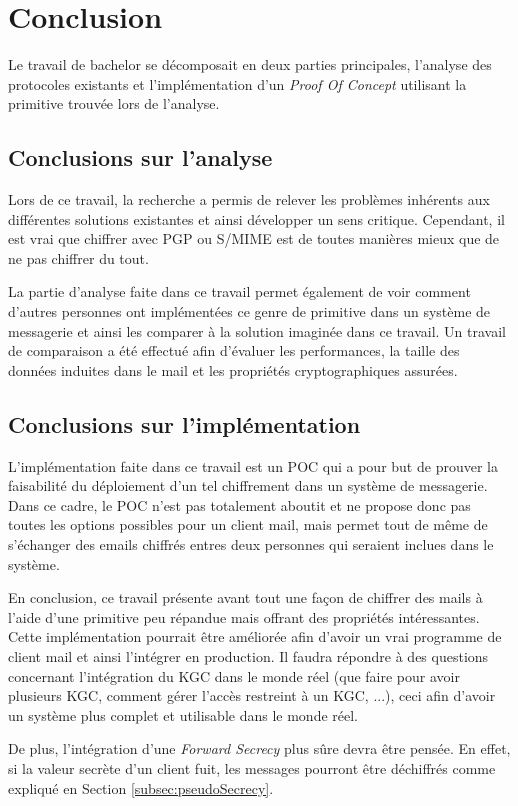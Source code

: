 \chapter{Conclusion}
\label{ch:conclusion}
Le travail de bachelor se décomposait en deux parties principales, l'analyse des protocoles existants et l'implémentation d'un \textit{Proof Of Concept} utilisant la primitive trouvée lors de l'analyse.
\section{Conclusions sur l'analyse}
Lors de ce travail, la recherche a permis de relever les problèmes inhérents aux différentes solutions existantes et ainsi développer un sens critique. Cependant, il est vrai que chiffrer avec PGP ou S/MIME est de toutes manières mieux que de ne pas chiffrer du tout.

La partie d'analyse faite dans ce travail permet également de voir comment d'autres personnes ont implémentées ce genre de primitive dans un système de messagerie et ainsi les comparer à la solution imaginée dans ce travail. Un travail de comparaison a été effectué afin d'évaluer les performances, la taille des données induites dans le mail et les propriétés cryptographiques assurées.

\section{Conclusions sur l'implémentation}
L'implémentation faite dans ce travail est un POC qui a pour but de prouver la faisabilité du déploiement d'un tel chiffrement dans un système de messagerie. Dans ce cadre, le POC n'est pas totalement aboutit et ne propose donc pas toutes les options possibles pour un client mail, mais permet tout de même de s'échanger des emails chiffrés entres deux personnes qui seraient inclues dans le système.

En conclusion, ce travail présente avant tout une façon de chiffrer des mails à l'aide d'une primitive peu répandue mais offrant des propriétés intéressantes. Cette implémentation pourrait être améliorée afin d'avoir un vrai programme de client mail et ainsi l'intégrer en production. Il faudra répondre à des questions concernant l'intégration du KGC dans le monde réel (que faire pour avoir plusieurs KGC, comment gérer l'accès restreint à un KGC, ...), ceci afin d'avoir un système plus complet et utilisable dans le monde réel.

De plus, l'intégration d'une \textit{Forward Secrecy} plus sûre devra être pensée. En effet, si la valeur secrète d'un client fuit, les messages pourront être déchiffrés comme expliqué en Section \ref{subsec:pseudoSecrecy}.


